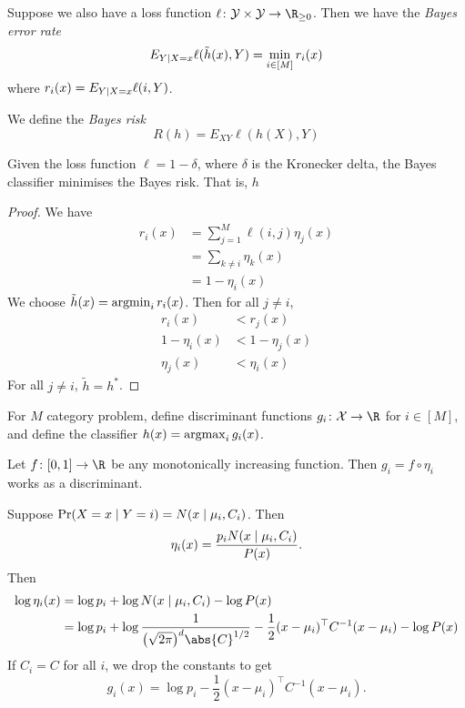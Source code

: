 Suppose we also have a loss function $\ell\colon \mathcal{Y} \times
\mathcal{Y} \to \R_{\ge 0}$.
Then we have the \emph{Bayes error rate} \[
    E_{Y \mid X = x} \ell(\tilde{h}(x), Y)
        = \min_{i \in [M]} r_i(x)
\] where $r_i(x) = E_{Y \mid X = x} \ell(i, Y)$.

We define the \emph{Bayes risk} \[
    R(h) = E_{XY} \ell(h(X), Y)
\]
\begin{theorem}
    Given the loss function $\ell = 1 - \delta$, where $\delta$ is the
    Kronecker delta, the Bayes classifier minimises the Bayes risk.
    That is, $h$
\end{theorem}
\begin{proof}
    We have \begin{align*}
        r_i(x) &= \sum_{j = 1}^{M} \ell(i, j) \eta_j(x) \\
            &= \sum_{k \ne i} \eta_k(x) \\
            &= 1 - \eta_i(x)
    \end{align*}
    We choose $\tilde{h}(x) = \operatorname*{argmin}_i r_i(x)$.
    Then for all $j \ne i$, \begin{align*}
        r_i(x) &< r_j(x) \\
        1 - \eta_i(x) &< 1 - \eta_j(x) \\
        \eta_j(x) &< \eta_i(x)
    \end{align*}
    For all $j \ne i$, $\tilde{h} = h^*$.
\end{proof}

For $M$ category problem, define discriminant functions
$g_i\colon \mathcal{X} \to \R$ for $i \in [M]$, and define the classifier
$h(x) = \operatorname*{argmax}_i g_i(x)$.

Let $f\colon [0, 1] \to \R$ be any monotonically increasing function.
Then $g_i = f \circ \eta_i$ works as a discriminant.

Suppose $\Pr(X = x \mid Y = i) = N(x \mid \mu_i, C_i)$.
Then \[
    \eta_i(x) = \frac{p_i N(x \mid \mu_i, C_i)}{P(x)}.
\]
Then \begin{align*}
    \log \eta_i(x) &= \log p_i + \log N(x \given \mu_i, C_i) - \log P(x) \\
          &= \log p_i + \log \frac1{\big(\sqrt{2\pi}\big)^d \abs{C}^{1 / 2}}
          - \frac12 (x - \mu_i)^\top C^{-1} (x - \mu_i)
          - \log P(x)
\end{align*}
If $C_i = C$ for all $i$, we drop the constants to get \[
    g_i(x) = \log p_i - \frac12 (x - \mu_i)^\top C^{-1} (x - \mu_i).
\]
